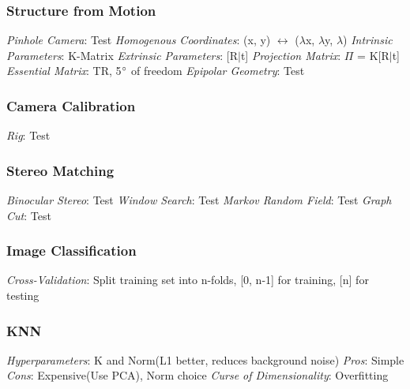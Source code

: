 \documentclass{article}
\author{Ian Chen}
\date{\today}
\begin{document}
    \begin{multicols*}{2}
        \subsubsection*{Structure from Motion}
        \textit{Pinhole Camera}: Test\newline
        \textit{Homogenous Coordinates}: (x, y) $\leftrightarrow$ ($\lambda$x, $\lambda$y, $\lambda$)\newline
        \textit{Intrinsic Parameters}: K-Matrix\newline
        \textit{Extrinsic Parameters}: [R$\mid$t]\newline
        \textit{Projection Matrix}: $\Pi$ = K[R$\mid$t]\newline
        \textit{Essential Matrix}: TR, 5$\degree$ of freedom\newline
        \textit{Epipolar Geometry}: Test\newline
        \subsubsection*{Camera Calibration}
        \textit{Rig}: Test\newline
        \subsubsection*{Stereo Matching}
        \textit{Binocular Stereo}: Test\newline
        \textit{Window Search}: Test\newline
        \textit{Markov Random Field}: Test\newline
        \textit{Graph Cut}: Test\newline
        \subsubsection*{Image Classification}
        \textit{Cross-Validation}: Split training set into n-folds, [0, n-1] for training, [n] for
        testing\newline
        \subsubsection*{KNN}
        \textit{Hyperparameters}: K and Norm(L1 better, reduces background noise)\newline
        \textit{Pros}: Simple\newline
        \textit{Cons}: Expensive(Use PCA), Norm choice\newline
        \textit{Curse of Dimensionality}: Overfitting\newline

\end{multicols*}
\end{document}
